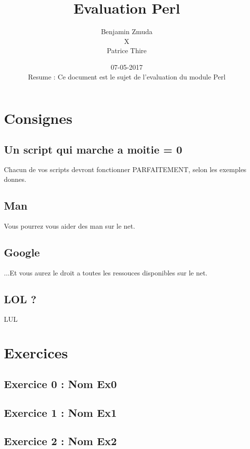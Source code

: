 \documentclass{article}
\title{Evaluation Perl}
\date{07-05-2017 \\ \vspace{13cm} Resume : Ce document est le sujet de l'evaluation du module Perl}
\author{Benjamin Zmuda \\ X \\ Patrice Thire}
\begin{document}
    \maketitle
    \newpage
    \renewcommand\contentsname{}
    \tableofcontents
    \newpage
	\section{Consignes}
	\subsection{Un script qui marche a moitie = 0}
	    Chacun de vos scripts devront fonctionner PARFAITEMENT, selon les exemples donnes. \\
	\subsection{Man}
	    Vous pourrez vous aider des man sur le net.
	\subsection{Google}
	    ...Et vous aurez le droit a toutes les ressouces disponibles sur le net.
	\subsection{LOL ?}
        LUL
	\newpage
	\section{Exercices}
	\subsection{Exercice 0 : Nom Ex0}
	\newpage
	\subsection{Exercice 1 : Nom Ex1}
	\newpage
	\subsection{Exercice 2 : Nom Ex2}
\end{document}
